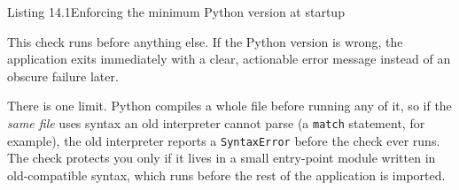 \begin{codeboxcap}[short]{\textcolor{accent}{Listing 14.1}\enspace Enforcing the minimum Python version at startup}

\begin{Shaded}
\begin{Highlighting}[]

\OperatorTok{=}\NormalTok{ (}\NormalTok{, }\NormalTok{)}

\OperatorTok{\textless{}}
    \NormalTok{(}
        \SpecialCharTok{\{}\NormalTok{REQUIRED\_PYTHON[}\NormalTok{]}\SpecialCharTok{\}}\SpecialCharTok{\{}\NormalTok{REQUIRED\_PYTHON[}\NormalTok{]}\SpecialCharTok{\}}
        \SpecialCharTok{\{}\SpecialCharTok{\}}\SpecialCharTok{\{}\SpecialCharTok{\}}\SpecialCharTok{\{}\SpecialCharTok{\}}
        \NormalTok{,}
        \OperatorTok{=}
\NormalTok{    )}
\NormalTok{)}
\end{Highlighting}
\end{Shaded}

\end{codeboxcap}

\noindent{}This check runs before anything else. If the Python version is wrong, the application exits immediately with a clear, actionable error message instead of an obscure failure later.

There is one limit. Python compiles a whole file before running any of it, so if the \emph{same file} uses syntax an old interpreter cannot parse (a \texttt{match} statement, for example), the old interpreter reports a \texttt{SyntaxError} before the check ever runs. The check protects you only if it lives in a small entry-point module written in old-compatible syntax, which runs before the rest of the application is imported.

